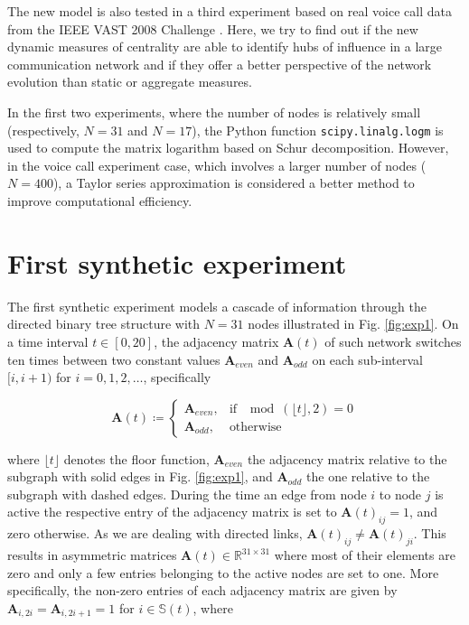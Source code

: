 The new model is also tested in a third experiment based on real voice call data from the IEEE VAST 2008 Challenge \cite{grinstein2008vast}. Here, we try to find out if the new dynamic measures of centrality are able to identify hubs of influence in a large communication network and if they offer a better perspective of the network evolution than static or aggregate measures.

In the first two experiments, where the number of nodes is relatively small (respectively, $N=31$ and $N=17$), the Python function \texttt{scipy.linalg.logm} is used to compute the matrix logarithm based on Schur decomposition. However, in the voice call experiment case, which involves a larger number of nodes ($N=400$), a Taylor series approximation is considered a better method to improve computational efficiency.

\section{First synthetic experiment}
\label{sec:synexp1}

The first synthetic experiment models a cascade of information through the directed binary tree structure with $N=31$ nodes illustrated in Fig. \ref{fig:exp1}. On a time interval $t \in [0,20]$, the adjacency matrix $\mathbf{A}(t)$ of such network switches ten times between two constant values $\mathbf{A}_{even}$ and $\mathbf{A}_{odd}$ on each sub-interval $[i, i + 1)$ for $i=0,1,2,\dots$, specifically

\begin{equation*}
\mathbf{A}(t)\coloneqq
    \begin{cases}
        \mathbf{A}_{even}, & \text{if } \mod(\lfloor t \rfloor, 2) = 0\\
        \mathbf{A}_{odd}, & \text{otherwise} 
    \end{cases}
\end{equation*}

where $\lfloor t \rfloor$ denotes the floor function, $\mathbf{A}_{even}$ the adjacency matrix relative to the subgraph with solid edges in Fig. \ref{fig:exp1}, and $\mathbf{A}_{odd}$ the one relative to the subgraph with dashed edges. During the time an edge from node $i$ to node $j$ is active the respective entry of the adjacency matrix is set to $\mathbf{A}(t)_{ij}=1$, and zero otherwise. As we are dealing with directed links, $\mathbf{A}(t)_{ij}\ne \mathbf{A}(t)_{ji}$. This results in asymmetric matrices $\mathbf{A}(t)\in \mathbb{R}^{31\times 31}$ where most of their elements are zero and only a few entries belonging to the active nodes are set to one. More specifically, the non-zero entries of each adjacency matrix are given by $\mathbf{A}_{i,2i} = \mathbf{A}_{i,2i+1} = 1$ for $i \in \mathbb{S}(t)$, where 


